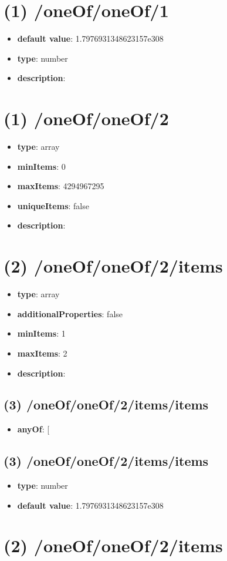 \section{(1) /oneOf/oneOf/1}
\begin{itemize}[leftmargin=1em]\item {\bf default value}: 1.7976931348623157e308
\item {\bf type}: number
\item {\bf description}: 
\end{itemize}\section{(1) /oneOf/oneOf/2}
\begin{itemize}[leftmargin=1em]\item {\bf type}: array
\item {\bf minItems}: 0
\item {\bf maxItems}: 4294967295
\item {\bf uniqueItems}: false
\item {\bf description}: 
\end{itemize}\section{(2) /oneOf/oneOf/2/items}
\begin{itemize}[leftmargin=2em]\item {\bf type}: array
\item {\bf additionalProperties}: false
\item {\bf minItems}: 1
\item {\bf maxItems}: 2
\item {\bf description}: 
\end{itemize}\subsection{(3) /oneOf/oneOf/2/items/items}
\begin{itemize}[leftmargin=3em]\item {\bf anyOf}: [\end{itemize}\subsection{(3) /oneOf/oneOf/2/items/items}
\begin{itemize}[leftmargin=3em]\item {\bf type}: number\item {\bf default value}: 1.7976931348623157e308
\end{itemize}\section{(2) /oneOf/oneOf/2/items}
